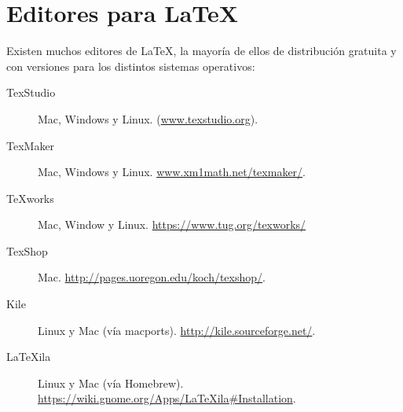 \section{Editores para \LaTeX}
Existen muchos editores de \LaTeX, la mayoría de ellos de distribución gratuita y con versiones para los distintos sistemas operativos:
\begin{description}
    \item [TexStudio] Mac, Windows y Linux. (\href{www.texstudio.org}{www.texstudio.org}).
    \item [TexMaker] Mac, Windows y Linux.  \href{www.xm1math.net/texmaker/}{www.xm1math.net/texmaker/}.
    \item[TeXworks] Mac, Window y Linux. \href{https://www.tug.org/texworks/}{https://www.tug.org/texworks/}
    \item [TexShop] Mac. \href{http://pages.uoregon.edu/koch/texshop/}{http://pages.uoregon.edu/koch/texshop/}.
    \item[Kile] Linux y Mac (vía macports). \href{http://kile.sourceforge.net/}{http://kile.sourceforge.net/}.
    \item[LaTeXila] Linux y Mac (vía Homebrew). \href{https://wiki.gnome.org/Apps/LaTeXila\#Installation}{https://wiki.gnome.org/Apps/LaTeXila\#Installation}.
\end{description}
